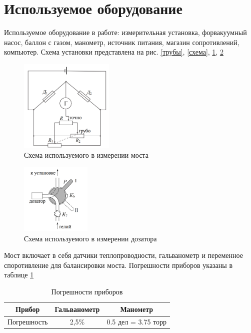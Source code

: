 \documentclass[a4paper,12pt]{article} %
\begin{document}
\section{Используемое оборудование}
Используемое оборудование в работе:
измерительная установка, форвакуумный насос, баллон с газом,  манометр, источник питания, магазин сопротивлений, компьютер.
Схема установки представлена на рис. \ref{трубы}, \ref{схема}, \ref{мост}, \ref{дозатор}
\begin{figure}[h!]
\begin{center}
\includegraphics[width=0.4\textwidth]{Мост}
\end{center}
\caption{Схема используемого в измерении моста} \label{мост}
\end{figure}
\begin{figure}[h!]
\begin{center}
\includegraphics[width=0.3\textwidth]{Дозатор}
\end{center}
\caption{Схема используемого в измерении дозатора} \label{дозатор}
\end{figure}
Мост включает в себя датчики теплопроводности, гальванометр и переменное споротивление для балансировки моста.
Погрешности приборов указаны в таблице \ref{погрешности}
\begin{table} \label{погрешности} \caption{Погрешности приборов}
\begin{tabular}{|c|c|c|}
\hline 
Прибор & Гальванометр & Манометр \\ 
\hline 
Погрешность & 2,5\%  & 0.5 дел = 3.75 торр \\ 
\hline 
\end{tabular} 
\end{table}
\end{document}
